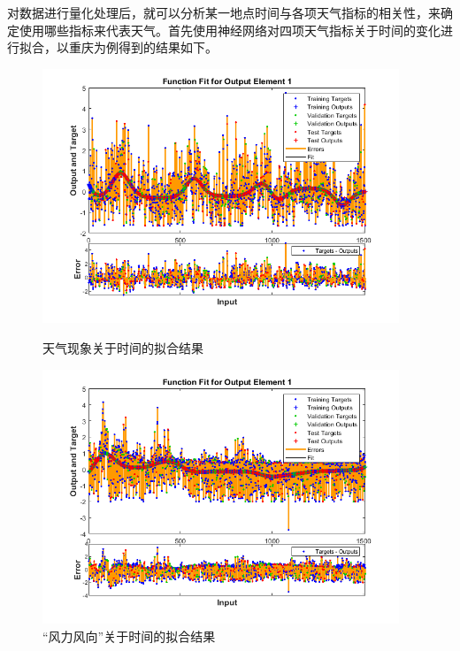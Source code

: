 \documentclass{cumcm}
\begin{document}
\begin{enumerate}
	对数据进行量化处理后，就可以分析某一地点时间与各项天气指标的相关性，来确定使用哪些指标来代表天气。首先使用神经网络对四项天气指标关于时间的变化进行拟合，以重庆为例得到的结果如下。
	\begin{figure}[H]
		\begin{minipage}[t]{0.5\linewidth}
		  \centering   
		  \includegraphics[width=0.95\textwidth]{img_backup/weather_fit.png}   
		  \caption{天气现象关于时间的拟合结果}   
		  \label{fig:weather_fit}   
		\end{minipage}   
		 \begin{minipage}[t]{0.5\linewidth} %
			\centering   
			\includegraphics[width=0.95\textwidth]{img_backup/wind_fit.png}   
			\caption{“风力风向”关于时间的拟合结果}   
			\label{fig:wind_fit}   
		  \end{minipage} 
	  \end{figure}

\end{enumerate}
\end{document}
